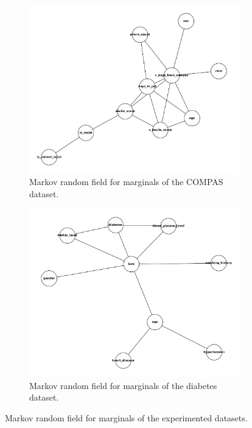 \documentclass[manuscript,screen,review,anonymous]{acmart}
\begin{document}
\begin{figure}
\begin{subfigure}[b]{0.3\textwidth}
      \includegraphics[width=\textwidth]{compas_mst}
      \caption{Markov random field for marginals of the COMPAS dataset.}
      \label{fig:compas_mst}
  \end{subfigure}
  \hfill
  \begin{subfigure}[b]{0.3\textwidth}
      \centering
      \includegraphics[width=\textwidth]{diabetes_mst}
      \caption{Markov random field for marginals of the diabetes dataset.}
      \label{fig:diabetes_mst}
  \end{subfigure}
      \caption{Markov random field for marginals of the experimented datasets.}
      \label{fig:msts}
\end{figure}
\end{document}
